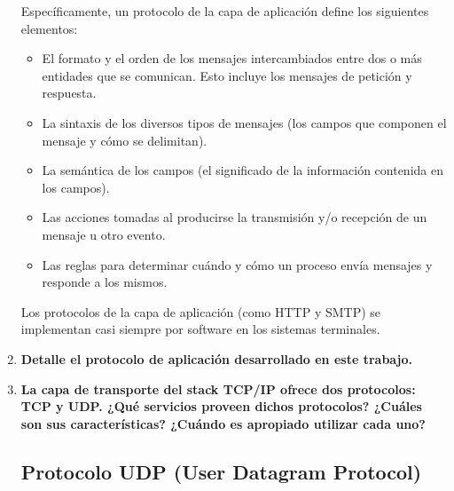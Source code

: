 \begin{enumerate}
    Específicamente, un protocolo de la capa de aplicación define los siguientes elementos:
    \begin{itemize}
        \item El formato y el orden de los mensajes intercambiados entre dos o más entidades que se comunican. Esto incluye los mensajes de petición y respuesta.
        \item La sintaxis de los diversos tipos de mensajes (los campos que componen el mensaje y cómo se delimitan).
        \item La semántica de los campos (el significado de la información contenida en los campos).
        \item Las acciones tomadas al producirse la transmisión y/o recepción de un mensaje u otro evento.
        \item Las reglas para determinar cuándo y cómo un proceso envía mensajes y responde a los mismos.
    \end{itemize}

    Los protocolos de la capa de aplicación (como HTTP y SMTP) se implementan casi siempre por software en los sistemas terminales.

    \item \textbf{Detalle el protocolo de aplicación desarrollado en este trabajo.}
    
    
    \item \textbf{La capa de transporte del stack TCP/IP ofrece dos protocolos: TCP y UDP. ¿Qué servicios proveen dichos protocolos? ¿Cuáles son sus características? ¿Cuándo es apropiado utilizar cada uno?}
    
    \subsection*{Protocolo UDP (User Datagram Protocol)}
    

\end{enumerate}
